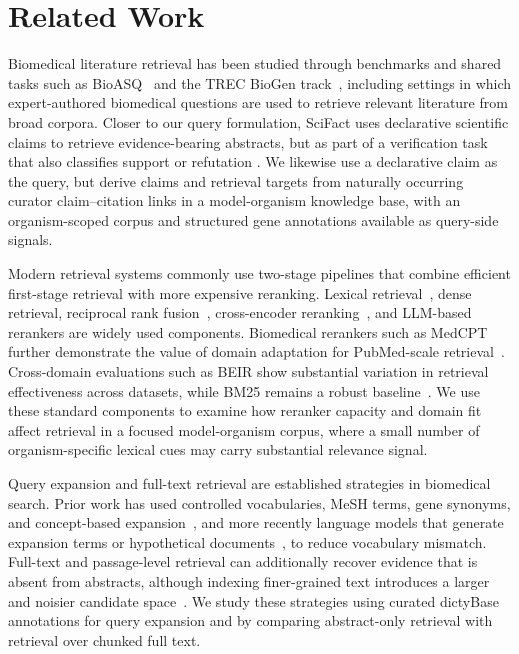 \documentclass[runningheads]{llncs}
\begin{document}
\section{Related Work}
Biomedical literature retrieval has been studied through benchmarks and shared
tasks such as BioASQ~\cite{tsatsaronis_overview_2015} and the TREC BioGen
track~\cite{coordinators-trec2025-papers-proc-4}, including settings in which
expert-authored biomedical questions are used to retrieve relevant literature
from broad corpora. Closer to our query formulation, SciFact uses declarative
scientific claims to retrieve evidence-bearing abstracts, but as part of a
verification task that also classifies support or refutation
\cite{wadden_fact_2020}. We likewise use a declarative claim as the query, but
derive claims and retrieval targets from naturally occurring curator
claim--citation links in a model-organism knowledge base, with an
organism-scoped corpus and structured gene annotations available as query-side
signals. 

Modern retrieval systems commonly use two-stage pipelines that combine
efficient first-stage retrieval with more expensive reranking. Lexical
retrieval~\cite{robertson_probabilistic_2009}, dense retrieval, reciprocal rank
fusion~\cite{cormack_reciprocal_2009}, cross-encoder reranking~\cite{bajaj_ms_2018}, and LLM-based
rerankers are widely used components. Biomedical rerankers such as MedCPT further
demonstrate the value of domain adaptation for PubMed-scale
retrieval~\cite{jin_medcpt_2023}. Cross-domain evaluations such as BEIR show
substantial variation in retrieval effectiveness across datasets, while BM25
remains a robust baseline~\cite{thakur_beir_2021}. We use these standard components to examine
how reranker capacity and domain fit affect retrieval in a focused
model-organism corpus, where a small number of organism-specific lexical cues
may carry substantial relevance signal.

Query expansion and full-text retrieval are established strategies in biomedical
search. Prior work has used controlled vocabularies, MeSH terms, gene synonyms,
and concept-based expansion~\cite{lu_empirical_2009}, and more recently language
models that generate expansion terms or hypothetical documents~\cite{gao_precise_2023,wang_query2doc_2023},
to reduce vocabulary mismatch. Full-text and
passage-level retrieval can additionally recover evidence that is absent from
abstracts, although indexing finer-grained text introduces a larger and noisier
candidate space~\cite{kim_towards_2022}. We study these strategies using curated
dictyBase annotations for query expansion and by comparing abstract-only
retrieval with retrieval over chunked full text.
\end{document}
